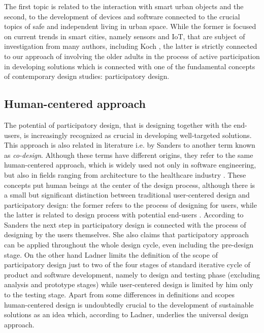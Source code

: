 \documentclass[sigconf]{acmart}
\begin{document}
The first topic is related to the interaction with smart urban objects and the second, to the development of devices and software connected to the crucial topics of safe and independent living in urban space. While the former is focused on current trends in smart cities, namely sensors and IoT, that are subject of investigation from many authors, including Koch \cite{kotteritzsch2016expand}, the latter is strictly connected to our approach of involving the older adults in the process of active participation in developing solutions which is connected with one of the fundamental concepts of contemporary design studies: participatory design.

\subsection{Human-centered approach}

The potential of participatory design, that is designing together with the end-users, is increasingly recognized as crucial in developing well-targeted solutions. This approach is also related in literature i.e. by Sanders \cite{sanders2008co} to another term known as \textit{co-design}. Although these terms have different origins, they refer to the same human-centered approach, which is widely used not only in software engineering, but also in fields ranging from architecture to the healthcare industry \cite{szebeko2010co}. These concepts put human beings at the center of the design process, although there is a small but significant distinction between traditional user-centered design and participatory design: the former refers to the process of designing for users, while the latter is related to design process with potential end-users \cite{sanders2002user,sanders2008co}. According to Sanders the next step in participatory design is connected with the process of designing by the users themselves. She also claims that participatory approach can be applied throughout the whole design cycle, even including the pre-design stage. On the other hand Ladner  \cite{ladner2015design} limits the definition of the scope of participatory design just to two of the four stages of standard iterative cycle of product and software development, namely to design and testing phase (excluding analysis and prototype stages) while user-centered design is limited by him only to the testing stage. Apart from some differences in definitions and scopes human-centered design is undoubtedly crucial to the development of sustainable solutions as an idea which, according to Ladner, underlies the universal design approach.
\end{document}
